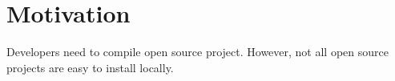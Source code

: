 
\section{Motivation}\label{motivation}

Developers need to compile open source project. However, not all open source projects are easy to install locally.
